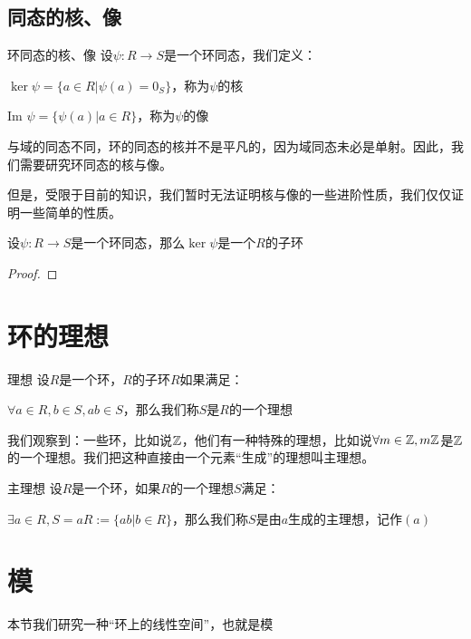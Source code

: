 \documentclass[12pt, a4paper, oneside, UTF8]{ctexbook}
\begin{document}
		\subsection{同态的核、像}
			\begin{defn}{环同态的核、像}{}
				设$\psi : R \rightarrow S$是一个环同态，我们定义：

				$\ker \psi = \{a \in R | \psi (a) = 0_S\}$，称为$\psi $的核

				$\text{Im } \psi = \{\psi (a) | a \in R\}$，称为$\psi $的像
			\end{defn}
			与域的同态不同，环的同态的核并不是平凡的，因为域同态未必是单射。因此，我们需要研究环同态的核与像。

			但是，受限于目前的知识，我们暂时无法证明核与像的一些进阶性质，我们仅仅证明一些简单的性质。
			\begin{proposition}
				设$\psi :R \rightarrow S$是一个环同态，那么$\ker \psi $是一个$R$的子环
			\end{proposition}
			\begin{proof}
				
			\end{proof}
	\section{环的理想}
		\begin{defn}{理想}{}
			设$R$是一个环，$R$的子环$R$如果满足：

			$\forall a \in R,b \in S,ab \in S$，那么我们称$S$是$R$的一个理想
		\end{defn}
		我们观察到：一些环，比如说$\mathbb{Z}$，他们有一种特殊的理想，比如说$\forall m \in \mathbb{Z},m\mathbb{Z}$是$\mathbb{Z}$的一个理想。我们把这种直接由一个元素“生成”的理想叫主理想。
		\begin{defn}{主理想}{}
			设$R$是一个环，如果$R$的一个理想$S$满足：

			$\exists a \in R,S=aR := \{ab | b \in R\}$，那么我们称$S$是由$a$生成的主理想，记作$(a)$
		\end{defn}
	\section{模}
		本节我们研究一种“环上的线性空间”，也就是模
\end{document}
